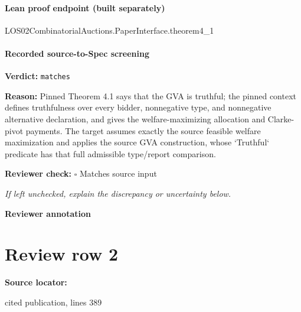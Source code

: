 \documentclass[10pt]{article}
\newcommand{\reviewerbox}{%
  \par\noindent\fbox{\parbox{0.96\linewidth}{\rule{0pt}{0.38in}}}\par
}
\newcommand{\reviewmatch}[1]{%
  \par\noindent\textbf{Reviewer check:} $\square$\; #1\par
  \noindent\emph{If left unchecked, explain the discrepancy or uncertainty below.}\par
}
\begin{document}
\paragraph{Lean proof endpoint (built separately)}\begin{ReviewVerbatim}
LOS02CombinatorialAuctions.PaperInterface.theorem4_1
\end{ReviewVerbatim}

\paragraph{Recorded source-to-Spec screening}
\textbf{Verdict:} \texttt{matches}
\\
{\raggedright
\textbf{Reason:} Pinned Theorem 4.\allowbreak{}1 says that the GVA is truthful;\allowbreak{} the pinned context defines truthfulness over every bidder, nonnegative type, and nonnegative alternative declaration, and gives the welfare-\allowbreak{}maximizing allocation and Clarke-\allowbreak{}pivot payments.\allowbreak{} The target assumes exactly the source feasible welfare maximization and applies the source GVA construction, whose `Truthful` predicate has that full admissible type/\allowbreak{}report comparison.\allowbreak{}
\par}
\reviewmatch{Matches source input}
\noindent\textbf{Reviewer annotation}\par
\reviewerbox
\clearpage
\hypertarget{source-claim-a7754ad8904f2e04}{}
\section*{Review row 2}
\textbf{Source locator:} {\footnotesize\raggedright cited publication, lines 389\par}
\end{document}
